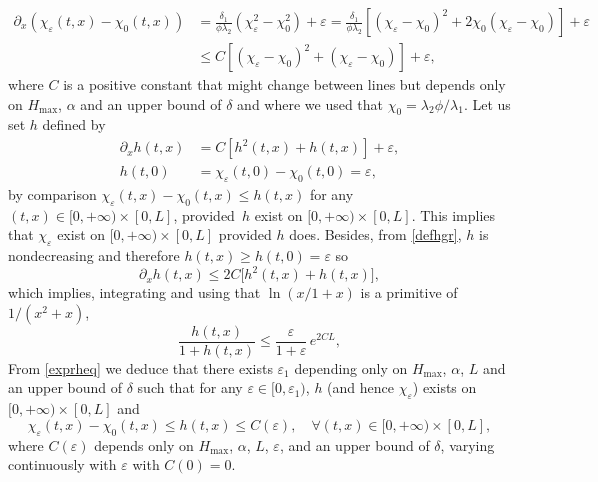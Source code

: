 \begin{equation*}
\begin{split}
\partial_{x}(\chi_{\varepsilon}(t,x)-\chi_{0}(t,x)) &= \frac{\delta_{1}}{\phi\lambda_{2}}(\chi_{\varepsilon}^{2}-\chi_{0}^{2})+\varepsilon=\frac{\delta_{1}}{\phi\lambda_{2}}\left[(\chi_{\varepsilon}-\chi_{0})^{2}+2\chi_{0}(\chi_{\varepsilon}-\chi_{0})\right]+\varepsilon\\
&\leq C\left[(\chi_{\varepsilon}-\chi_{0})^{2}+(\chi_{\varepsilon}-\chi_{0})\right]+\varepsilon,
\end{split}
\end{equation*}
where $C$ is a positive constant that might change between lines but depends only on $H_{\max}$, $\alpha$ and an upper bound of $\delta$ and where we used that $\chi_{0} = \lambda_{2}\phi/\lambda_{1}$. Let us set $h$ defined by
\begin{equation}
\label{defhgr}
\begin{split}
\partial_{x}h(t,x) &= C\left[h^{2}(t,x)+h(t,x)\right]+\varepsilon,\\
h(t,0) &= \chi_{\varepsilon}(t,0)-\chi_{0}(t,0) = \varepsilon,
\end{split}
\end{equation}
{by comparison} $\chi_{\varepsilon}(t,x)-\chi_{0}(t,x)\leq h(t,x)$ for any $(t,x)\in[0,+\infty)\times [0,L]$, provided~$h$ exist on $[0,+\infty)\times [0,L]$. This implies that $\chi_{\varepsilon}$ exist on $[0,+\infty)\times [0,L]$ provided $h$ does. Besides, from \eqref{defhgr}, $h$ is nondecreasing and therefore $h(t,x)\geq h(t,0)=\varepsilon$ so
\begin{equation*}
\partial_{x}h(t,x) \leq 2C\bigl[h^{2}(t,x)+h(t,x)\bigr],
\end{equation*}
which implies, integrating and using that $\ln(x/1+x)$ is a primitive of $1/(x^{2}+x)$,
\begin{equation}
\label{exprheq}
\frac{h(t,x)}{1+h(t,x)}\leq \frac{\varepsilon}{1+\varepsilon}\,e^{2CL},
\end{equation}
From \eqref{exprheq}
we deduce that there exists
$\varepsilon_{1}$ depending only on $H_{\max}$, $\alpha$, $L$ and an upper bound of $\delta$ such that for any $\varepsilon\in[0,\varepsilon_{1})$, $h$ (and hence $\chi_{\varepsilon}$) exists on $[0,+\infty)\times[0,L]$ and
\begin{equation*}
\chi_{\varepsilon}(t,x)-\chi_{0}(t,x)\leq h(t,x)\leq C(\varepsilon),\quad\forall (t,x)\in[0,+\infty)\times[0,L],
\end{equation*}
where $C(\varepsilon)$ depends only on $H_{\max}$, $\alpha$, $L$, $\varepsilon$, and an upper bound of $\delta$, varying continuously with $\varepsilon$ with $C(0)=0$.
